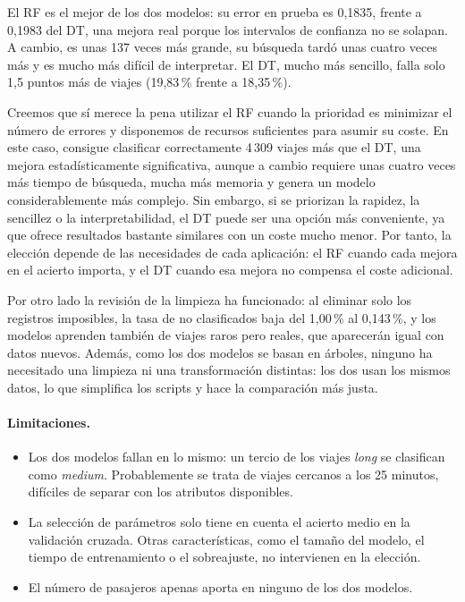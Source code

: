 \documentclass[12pt,a4paper]{article}
\begin{document}
El \ac{RF} es el mejor de los dos modelos: su error en prueba es 0,1835,
frente a 0,1983 del \ac{DT}, una mejora real porque los intervalos de
confianza no se solapan. A cambio, es unas 137 veces más grande, su
búsqueda tardó unas cuatro veces más y es mucho más difícil de interpretar. El
\ac{DT}, mucho más sencillo, falla solo 1,5 puntos más de viajes (19,83\,\%
frente a 18,35\,\%).

Creemos que sí merece la pena utilizar el \ac{RF} cuando la prioridad es minimizar el número de errores y disponemos de recursos suficientes para asumir su coste. En este caso, consigue clasificar correctamente 4\,309 viajes más que el \ac{DT}, una mejora estadísticamente significativa, aunque a cambio requiere unas cuatro veces más tiempo de búsqueda, mucha más memoria y genera un modelo considerablemente más complejo. Sin embargo, si se priorizan la rapidez, la sencillez o la interpretabilidad, el \ac{DT} puede ser una opción más conveniente, ya que ofrece resultados bastante similares con un coste mucho menor. Por tanto, la elección depende de las necesidades de cada aplicación: el \ac{RF} cuando cada mejora en el acierto importa, y el \ac{DT} cuando esa mejora no compensa el coste adicional.

Por otro lado la revisión de la limpieza ha funcionado: al eliminar solo los registros
imposibles, la tasa de no clasificados baja del 1,00\,\% al 0,143\,\%, y
los modelos aprenden también de viajes raros pero reales, que aparecerán
igual con datos nuevos. Además, como los dos modelos se basan en árboles,
ninguno ha necesitado una limpieza ni una transformación distintas: los dos
usan los mismos datos, lo que simplifica los scripts y hace la comparación
más justa.

\paragraph{Limitaciones.}
\begin{itemize}
    \item Los dos modelos fallan en lo mismo: un tercio de los viajes
    \textit{long} se clasifican como \textit{medium}. Probablemente se trata de
    viajes cercanos a los 25 minutos, difíciles de separar con los atributos
    disponibles.
    \item La selección de parámetros solo tiene en cuenta el acierto medio
    en la validación cruzada. Otras características, como el tamaño del
    modelo, el tiempo de entrenamiento o el sobreajuste, no intervienen en
    la elección.
    \item El número de pasajeros apenas aporta en ninguno de los dos
    modelos.
\end{itemize}
\end{document}
